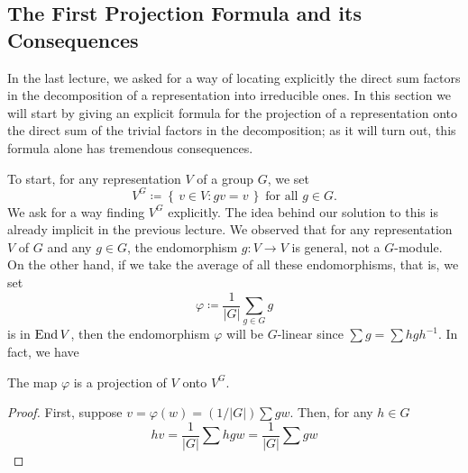 \subsection{The First Projection Formula and its Consequences}
In the last lecture, we asked for a way of locating explicitly the direct
sum factors in the decomposition of a representation into irreducible
ones. In this section we will start by giving an explicit formula for the
projection of a representation onto the direct sum of the trivial factors
in the decomposition; as it will turn out, this formula alone has tremendous
consequences.

To start, for any representation $V$ of a group $G$, we set
\[
V^G\coloneq\left\{\,v\in V:gv=v\,\right\}
\;\text{for all $g\in G$.}
\]
We ask for a way finding $V^G$ explicitly. The idea behind our solution to
this is already implicit in the previous lecture. We observed that for any
representation $V$ of $G$ and any $g\in G$, the endomorphism $g\colon V\to
V$ is general, not a $G$-module. On the other hand, if we take the average
of all these endomorphisms, that is, we set
\[
\varphi\coloneq\frac{1}{|G|}\sum_{g\in G}g
\]
is in $\operatorname{End} V$, then the endomorphism $\varphi$ will be $G$-linear since
$\sum g=\sum hgh^{-1}$. In fact, we have
\begin{proposition}
The map $\varphi$ is a projection of $V$ onto $V^G$.
\end{proposition}

\begin{proof}
First, suppose $v=\varphi(w)=(1/|G|)\sum gw$. Then, for any $h\in
G$
\[
hv=\frac{1}{|G|}\sum hgw=\frac{1}{|G|}\sum gw
\]
\end{proof}

